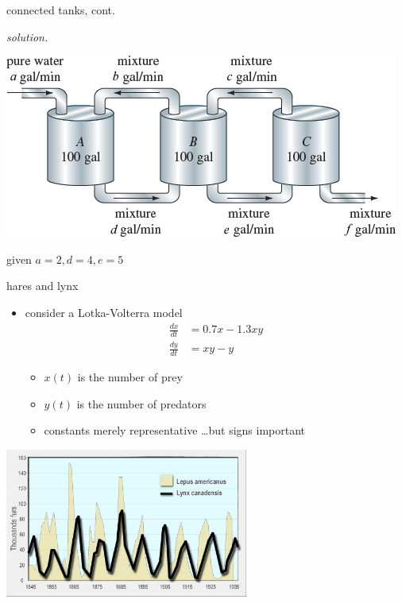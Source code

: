 \documentclass[urlcolor=blue,dvipsnames]{beamer}
\begin{document}
\begin{frame}{connected tanks, cont.}

\noindent \emph{solution.}

\vspace{45mm}

\hfill \begin{minipage}{0.55\textwidth}
\includegraphics[width=\textwidth]{figs/three-tanks}

\scriptsize
\hfill given $a=2,d=4,e=5$
\end{minipage}
\end{frame}


\begin{frame}{hares and lynx}

\begin{itemize}
\item consider a Lotka-Volterra model
\begin{align*}
\frac{dx}{dt} &= 0.7 x - 1.3 xy \\
\frac{dy}{dt} &= xy - y
\end{align*}

\vspace{-2mm}
    \begin{itemize}
    \item $x(t)$ is the number of prey
    \item $y(t)$ is the number of predators
    \item constants merely representative \dots but signs important
    \end{itemize}
\end{itemize}

\bigskip
\hfill \includegraphics[width=0.6\textwidth]{figs/hares-lynx}
\end{frame}
\end{document}

